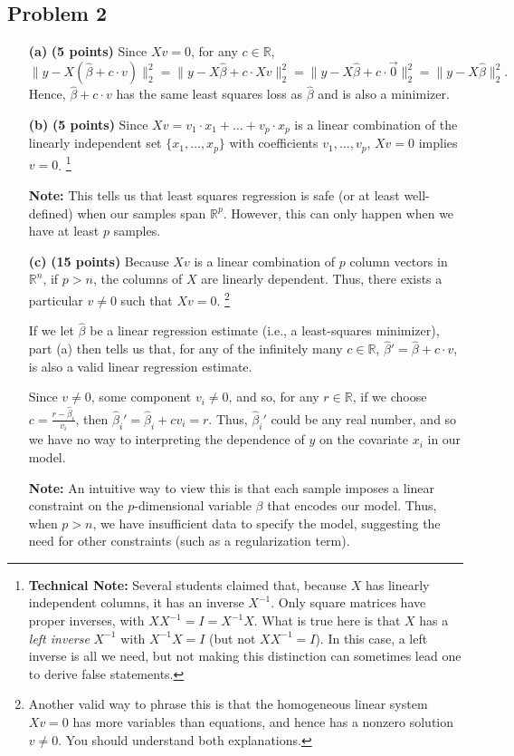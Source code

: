 \documentclass[12pt]{article}
\newcommand{\inv}{^{-1}}                            %
\newcommand{\R}{\mathbb{R}}                         %
\renewcommand{\hat}{\widehat}
\begin{document}
\subsection{Problem 2}
\begin{enumerate}
\item[{\bf (a)}] {\bf (5 points)}
Since $Xv = 0$, for any $c \in \R$,
\[\|y - X(\hat\beta + c \cdot v)\|_2^2
    = \|y - X\hat\beta + c \cdot Xv\|_2^2
    = \|y - X\hat\beta + c \cdot \vec 0\|_2^2
    = \|y - X\hat\beta\|_2^2.
\]
Hence, $\hat\beta + c \cdot v$ has the same least squares loss as $\hat\beta$
and is also a minimizer.

\item[{\bf (b)}] {\bf (5 points)}
Since $Xv = v_1 \cdot x_1 + \dots + v_p \cdot x_p$ is a linear combination of
the linearly independent set $\{x_1,\dots,x_p\}$ with coefficients
$v_1,\dots,v_p$, $Xv = 0$ implies $v = 0$.
\footnote{
{\bf Technical Note:} Several students claimed that, because $X$ has linearly
independent columns, it has an inverse $X\inv$. Only square matrices have
proper inverses, with $XX\inv = I = X\inv X$. What is true here is that $X$ has
a \emph{left inverse} $X\inv$ with $X\inv X = I$ (but not $XX\inv = I$). In
this case, a left inverse is all we need, but not making this distinction can
sometimes lead one to derive false statements.}

{\bf Note:} This tells us that least squares regression is safe (or at
least well-defined) when our samples span $\R^p$. However, this can only happen
when we have at least $p$ samples.

\item[{\bf (c)}] {\bf (15 points)} Because $Xv$ is a linear combination of $p$
column vectors in $\R^n$, if $p > n$, the columns of $X$ are linearly
dependent. Thus, there exists a particular $v \neq 0$ such that $Xv = 0$.
\footnote{Another valid way to phrase this is that the homogeneous linear
system $Xv = 0$ has more variables than equations, and hence has a nonzero
solution $v \neq 0$. You should understand both explanations.}

If we let $\hat\beta$ be a linear regression estimate (i.e., a least-squares
minimizer), part (a) then tells us that, for any of the infinitely many
$c \in \R$, $\hat\beta' = \hat\beta + c \cdot v$, is also a valid linear
regression estimate.

Since $v \neq 0$, some component $v_i \neq 0$, and so, for any $r \in \R$, if
we choose $c = \frac{r - \hat\beta_i}{v_i}$, then
$\hat\beta_i' = \hat\beta_i + c v_i = r$. Thus, $\hat\beta_i'$ could be any
real number, and so we have no way to interpreting the dependence of $y$ on the
covariate $x_i$ in our model.

{\bf Note:} An intuitive way to view this is that each sample imposes a linear
constraint on the $p$-dimensional variable $\beta$ that encodes our model.
Thus, when $p > n$, we have insufficient data to specify the model, suggesting
the need for other constraints (such as a regularization term).
\end{enumerate}
\end{document}
